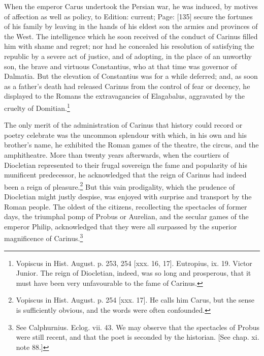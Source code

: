 When the emperor Carus undertook the Persian war, he was induced, by motives of affection as well as policy, to Edition: current; Page: [135] secure the fortunes of his family by leaving in the hands of his eldest son the armies and provinces of the West. The intelligence which he soon received of the conduct of Carinus filled him with shame and regret; nor had he concealed his resolution of satisfying the republic by a severe act of justice, and of adopting, in the place of an unworthy son, the brave and virtuous Constantius, who at that time was governor of Dalmatia. But the elevation of Constantius was for a while deferred; and, as soon as a father\texthebrew{}’s death had released Carinus from the control of fear or decency, he displayed to the Romans the extravagancies of Elagabalus, aggravated by the cruelty of Domitian.\footnote{Vopiscus in Hist. August. p. 253, 254 [xxx. 16, 17]. Eutropius, ix. 19. Victor Junior. The reign of Diocletian, indeed, was so long and prosperous, that it must have been very unfavourable to the fame of Carinus.}

The only merit of the administration of Carinus that history could record or poetry celebrate was the uncommon splendour with which, in his own and his brother\texthebrew{}’s name, he exhibited the Roman games of the theatre, the circus, and the amphitheatre. More than twenty years afterwards, when the courtiers of Diocletian represented to their frugal sovereign the fame and popularity of his munificent predecessor, he acknowledged that the reign of Carinus had indeed been a reign of pleasure.\footnote{Vopiscus in Hist. August. p. 254 [xxx. 17]. He calls him Carus, but the sense is sufficiently obvious, and the words were often confounded.} But this vain prodigality, which the prudence of Diocletian might justly despise, was enjoyed with surprise and transport by the Roman people. The oldest of the citizens, recollecting the spectacles of former days, the triumphal pomp of Probus or Aurelian, and the secular games of the emperor Philip, acknowledged that they were all surpassed by the superior magnificence of Carinus.\footnote{See Calphurnius. Eclog. vii. 43. We may observe that the spectacles of Probus were still recent, and that the poet is seconded by the historian. [See chap. xi. note 88.]}

